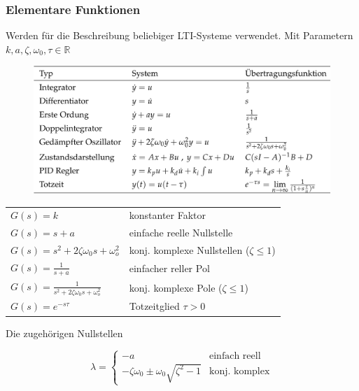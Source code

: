 \documentclass[
  10pt,
  a4paper,
  twocolumn]{article}
\makeatletter
\numberwithin{equation}{section}
\newenvironment{conditions}
  {\par\vspace{\abovedisplayskip}\noindent\begin{tabular}{>{$}l<{$} @{${}:{}$} l}}
  {\end{tabular}\par\vspace{\belowdisplayskip}}
\makeatother
\begin{document}
\hypertarget{elementare-funktionen}{%
\subsubsection{Elementare Funktionen}\label{elementare-funktionen}}

Werden für die Beschreibung beliebiger LTI-Systeme verwendet. Mit
Parametern \(k,a,\zeta,\omega_0,\tau \in \mathbb{R}\)

\begin{figure}[H]

{\centering \includegraphics{images/paste-16.png}

}

\end{figure}

\begin{conditions}
  G(s)=k                                         & konstanter Faktor \\
  G(s)=s + a                                     & einfache reelle Nullstelle \\
  G(s)=s^2+2\zeta\omega_0 s+\omega_o^2           & konj. komplexe Nullstellen ($\zeta \leq 1$) \\
  G(s)=\frac{1}{s+a}                             & einfacher reller Pol \\
  G(s)=\frac{1}{s^2+2\zeta\omega_0 s+\omega_o^2} & konj. komplexe Pole ($\zeta\leq 1$) \\
  G(s)=e^{-s\tau}                                & Totzeitglied $\tau > 0$ \\
\end{conditions}

Die zugehörigen Nullstellen

\[
\lambda = \left\{ \begin{array}{cl}
-a & \text{einfach reell} \\
-\zeta\omega_0 \pm \omega_0 \sqrt{\zeta^2-1} & \text{konj. komplex}
\end{array}\right.
\]
\end{document}
